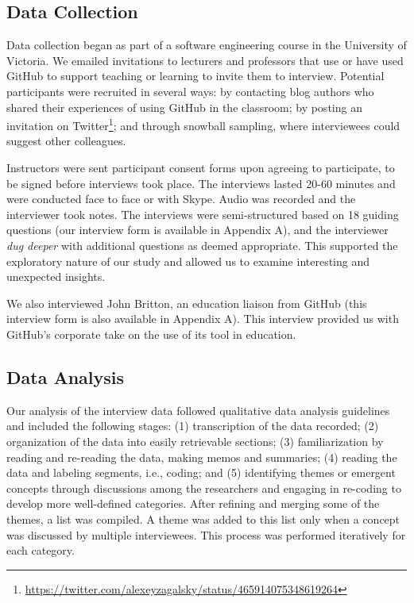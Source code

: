 \subsection{Data Collection}
Data collection began as part of a software engineering course in the University of Victoria. We emailed invitations to lecturers and professors that use or have used GitHub to support teaching or learning to invite them to interview. Potential participants were recruited in several ways: by contacting blog authors who shared their experiences of using GitHub in the classroom; by posting an invitation on Twitter\footnote{\url{https://twitter.com/alexeyzagalsky/status/465914075348619264}}; and through snowball sampling, where interviewees could suggest other colleagues.

Instructors were sent participant consent forms upon agreeing to participate, to be signed before interviews took place. The interviews lasted 20-60 minutes and were conducted face to face or with Skype. Audio was recorded and the interviewer took notes. The interviews were semi-structured based on 18 guiding questions (our interview form is available in Appendix A), and the interviewer \textit{dug deeper} with additional questions as deemed appropriate. This supported the exploratory nature of our study and allowed us to examine interesting and unexpected insights.

We also interviewed John Britton, an education liaison from GitHub (this interview form is also available in Appendix A). This interview provided us with GitHub's corporate take on the use of its tool in education.

\subsection{Data Analysis}
Our analysis of the interview data followed qualitative data analysis guidelines \cite{lacey2001qualitative,seaman1999qualitative} and included the following stages: (1) transcription of the data recorded; (2) organization of the data into easily retrievable sections; (3) familiarization by reading and re-reading the data, making memos and summaries; (4) reading the data and labeling segments, i.e., coding; and (5) identifying themes or emergent concepts through discussions among the researchers and engaging in re-coding to develop more well-defined categories. After refining and merging some of the themes, a list was compiled. A theme was added to this list only when a concept was discussed by multiple interviewees. This process was performed iteratively for each category.

